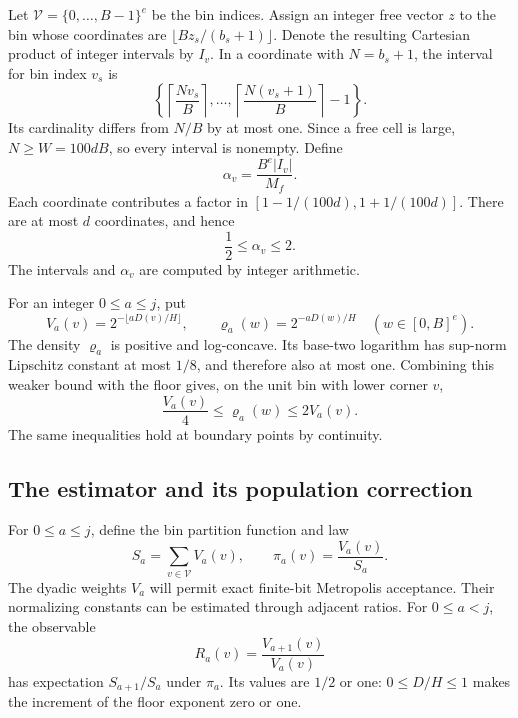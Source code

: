 Let $\mathcal V=\{0,\ldots,B-1\}^e$ be the bin indices.  Assign an
integer free vector $z$ to the bin whose coordinates are
$\lfloor Bz_s/(b_s+1)\rfloor$.  Denote the resulting Cartesian product
of integer intervals by $I_v$.  In a coordinate with $N=b_s+1$, the
interval for bin index $v_s$ is
\[
 \left\{\left\lceil\frac{Nv_s}{B}\right\rceil,
 \ldots,
 \left\lceil\frac{N(v_s+1)}{B}\right\rceil-1\right\}.
\]
Its cardinality differs from $N/B$ by at most one.  Since a free cell
is large, $N\ge W=100dB$, so every interval is nonempty.  Define
\[
 \alpha_v=\frac{B^e|I_v|}{M_f}.
\]
Each coordinate contributes a factor in
$[1-1/(100d),1+1/(100d)]$.  There are at most $d$ coordinates, and hence
\begin{equation}
 \frac12\le\alpha_v\le2.
 \label{eq:bin-populations}
\end{equation}
The intervals and $\alpha_v$ are computed by integer arithmetic.

For an integer $0\le a\le j$, put
\[
 V_a(v)=2^{-\lfloor aD(v)/H\rfloor},
 \qquad
 \varrho_a(w)=2^{-aD(w)/H}\quad(w\in[0,B]^e).
\]
The density $\varrho_a$ is positive and log-concave.  Its base-two
logarithm has sup-norm Lipschitz constant at most $1/8$, and therefore
also at most one.  Combining this weaker bound with the floor gives,
on the unit bin with lower corner $v$,
\begin{equation}
 \frac{V_a(v)}4\le\varrho_a(w)\le2V_a(v).
 \label{eq:bin-density-comparison}
\end{equation}
The same inequalities hold at boundary points by continuity.

\subsection{The estimator and its population correction}

For $0\le a\le j$, define the bin partition function and law
\[
 S_a=\sum_{v\in\mathcal V}V_a(v),\qquad
 \pi_a(v)=\frac{V_a(v)}{S_a}.
\]
The dyadic weights $V_a$ will permit exact finite-bit Metropolis
acceptance. Their normalizing constants can be estimated through
adjacent ratios. For $0\le a<j$, the observable
\[
 R_a(v)=\frac{V_{a+1}(v)}{V_a(v)}
\]
has expectation $S_{a+1}/S_a$ under $\pi_a$.  Its values are $1/2$ or
one: $0\le D/H\le1$ makes the increment of the floor exponent zero
or one.

